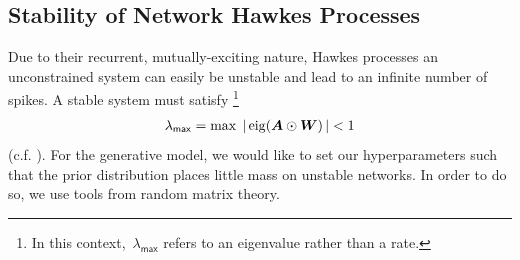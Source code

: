 


\subsection{Stability of Network Hawkes Processes}
\label{sec:stability}


Due to their recurrent, mutually-exciting nature, Hawkes processes
an unconstrained system can easily be unstable and lead to an infinite 
number of spikes. A stable system must satisfy \footnote{In
  this context,~${\lambda_{\mathsf{max}}}$ refers to an eigenvalue
  rather than a rate.}
\begin{align*}
  \lambda_{\mathsf{max}}=\max\; |\,\mathrm{eig}(\boldsymbol{A}\odot\boldsymbol{W})\,| < 1
\end{align*}
(c.f. \citet{Daley-1988}).
For the generative model, we would like
to set our hyperparameters such that the prior distribution places
little mass on unstable networks. In order to do so, we use tools from
random matrix theory.

